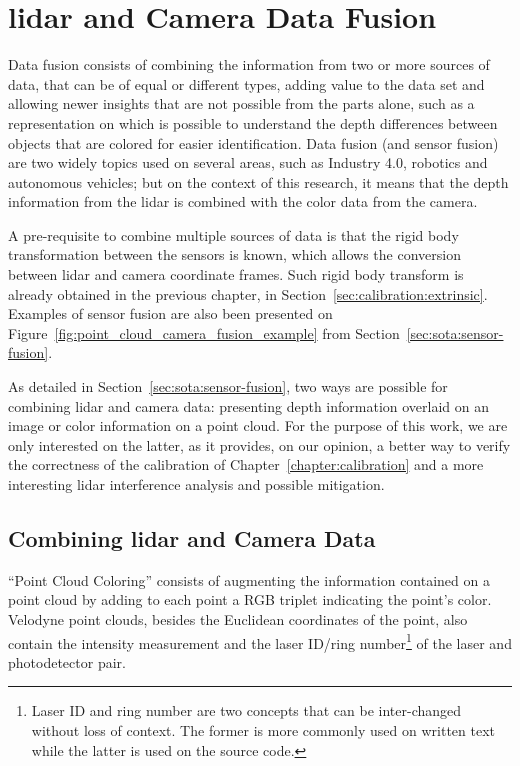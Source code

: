 \chapter{\ac{lidar} and Camera Data Fusion}
\label{chapter:sensor-fusion}

Data fusion consists of combining the information from two or more sources of data, that can be of equal or different types, adding value to the data set and allowing newer insights that are not possible from the parts alone, such as a representation on which is possible to understand the depth differences  between objects that are colored for easier identification. Data fusion (and sensor fusion) are two widely topics used on several areas, such as Industry 4.0, robotics and autonomous vehicles; but on the context of this research, it means that the depth information from the \ac{lidar} is combined with the color data from the camera.

A pre-requisite to combine multiple sources of data is that the rigid body transformation between the sensors is known, which allows the conversion between \ac{lidar} and camera coordinate frames. Such rigid body transform is already obtained in the previous chapter, in Section~\ref{sec:calibration:extrinsic}. Examples of sensor fusion are also been presented on Figure~\ref{fig:point_cloud_camera_fusion_example} from Section~\ref{sec:sota:sensor-fusion}.

As detailed in Section~\ref{sec:sota:sensor-fusion}, two ways are possible for combining \ac{lidar} and camera data: presenting depth information overlaid on an image or color information on a point cloud. For the purpose of this work, we are only interested on the latter, as it provides, on our opinion, a better way to verify the correctness of the calibration of Chapter~\ref{chapter:calibration} and a more interesting \ac{lidar} interference analysis and possible mitigation.

\section{Combining \ac{lidar} and Camera Data}
``Point Cloud Coloring'' consists of augmenting the information contained on a point cloud by adding to each point a RGB triplet indicating the point's color. Velodyne point clouds, besides the Euclidean coordinates of the point, also contain the intensity measurement and the laser ID/ring number\footnote{Laser ID and ring number are two concepts that can be inter-changed without loss of context. The former is more commonly used on written text while the latter is used on the source code.} of the laser and photodetector pair.

